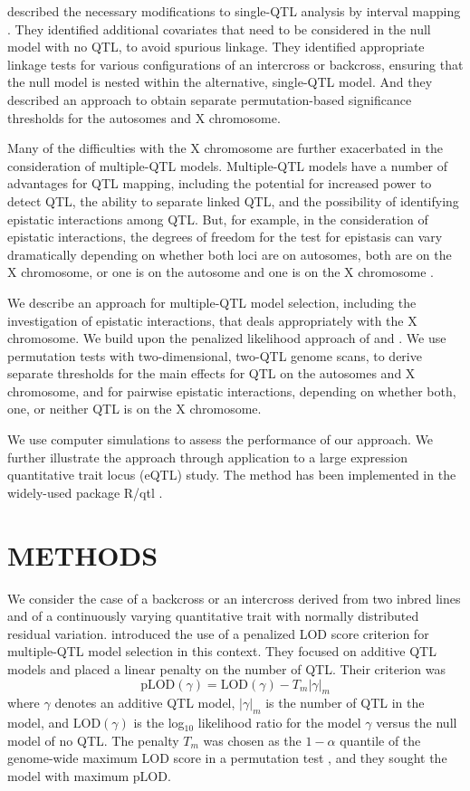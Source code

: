 \documentclass[12pt,letterpaper]{article}
\newcommand{\LOD}{\text{LOD}}
\newcommand{\pLOD}{\text{pLOD}}
\begin{document}
\citet{Broman2006} described the necessary modifications to single-QTL
analysis by interval mapping \citep{Lander1989}. They identified
additional covariates that need to be considered in the null model
with no QTL, to avoid spurious linkage. They identified appropriate
linkage tests for various configurations of an intercross or
backcross, ensuring that the null model is nested within the
alternative, single-QTL model. And they described an approach to
obtain separate permutation-based significance thresholds for the
autosomes and X chromosome.

Many of the difficulties with the X chromosome are further exacerbated
in the consideration of multiple-QTL models. Multiple-QTL models have
a number of advantages for QTL mapping, including the potential for
increased power to detect QTL, the ability to separate linked QTL, and
the possibility of identifying epistatic interactions among QTL. But,
for example, in the consideration of epistatic interactions, the
degrees of freedom for the test for epistasis can vary dramatically
depending on whether both loci are on autosomes, both are on the X
chromosome, or one is on the autosome and one is on the X chromosome
\citep{Broman2009}.

We describe an approach for multiple-QTL model selection, including
the investigation of epistatic interactions, that deals appropriately
with the X chromosome. We build upon the penalized likelihood approach
of \citet{Broman2002} and \citet{Manichaikul2009}. We use permutation
tests \citep{Churchill1994} with two-dimensional, two-QTL genome
scans, to derive separate thresholds for the main effects for QTL on
the autosomes and X chromosome, and for pairwise epistatic
interactions, depending on whether both, one, or neither QTL is on the
X chromosome.

We use computer simulations to assess the performance of our approach.
We further illustrate the approach through application to a large
expression quantitative trait locus (eQTL) study. The method has been
implemented in the widely-used package R/qtl \citep{Broman2003}.




\clearpage
\section*{METHODS}

We consider the case of a backcross or an intercross derived from two
inbred lines and of a continuously varying quantitative trait with
normally distributed residual variation. \citet{Broman2002} introduced
the use of a penalized LOD score criterion for multiple-QTL model
selection in this context. They focused on additive QTL models and
placed a linear penalty on the number of QTL. Their criterion was
$$\pLOD(\gamma) = \LOD(\gamma) - T_m|\gamma|_m$$
where $\gamma$ denotes an additive QTL model, $|\gamma|_m$ is the
number of QTL in the model, and $\LOD(\gamma)$ is the log$_{10}$
likelihood ratio for the model $\gamma$ versus the null model of no
QTL. The penalty $T_m$ was chosen as the $1-\alpha$ quantile of the
genome-wide maximum LOD score in a permutation test
\citep[see][]{Churchill1994}, and they sought the model with maximum
pLOD.
\end{document}
